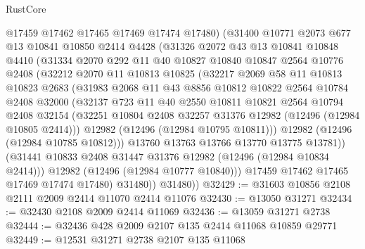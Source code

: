 \begin{lexlean}{RustCore}
\begin{coremodule}
            @17459
            @17462
            @17465
            @17469
            @17474
            @17480)
          (@31400
            @10771
            @2073
            @677
            @13
            @10841
            @10850
            @2414
            @4428
            (@31326
              @2072
              @43
              @13
              @10841
              @10848
              @4410
              (@31334
                @2070
                @292
                @11
                @40
                @10827
                @10840
                @10847
                @2564
                @10776
                @2408
                (@32212
                  @2070
                  @11
                  @10813
                  @10825
                  (@32217
                    @2069
                    @58
                    @11
                    @10813
                    @10823
                    @2683
                    (@31983
                      @2068
                      @11
                      @43
                      @8856
                      @10812
                      @10822
                      @2564
                      @10784
                      @2408
                      @32000
                      (@32137
                        @723
                        @11
                        @40
                        @2550
                        @10811
                        @10821
                        @2564
                        @10794
                        @2408
                        @32154
                        (@32251 @10804 @2408 @32257 @31376 @12982 (@12496 (@12984 @10805 @2414)))
                        @12982
                        (@12496 (@12984 @10795 @10811)))
                      @12982
                      (@12496 (@12984 @10785 @10812)))
                    @13760
                    @13763
                    @13766
                    @13770
                    @13775
                    @13781))
                (@31441 @10833 @2408 @31447 @31376 @12982 (@12496 (@12984 @10834 @2414)))
                @12982
                (@12496 (@12984 @10777 @10840)))
              @17459
              @17462
              @17465
              @17469
              @17474
              @17480)
            @31480))
        @31480))
@32429 := @31603 @10856 @2108 @2111 @2009 @2414 @11070 @2414 @11076
@32430 := @13050 @31271
@32434 := @32430 @2108 @2009 @2414 @11069
@32436 := @13059 @31271 @2738
@32444 := @32436 @428 @2009 @2107 @135 @2414 @11068 @10859 @29771
@32449 := @12531 @31271 @2738 @2107 @135 @11068

\end{coremodule}
\end{lexlean}
